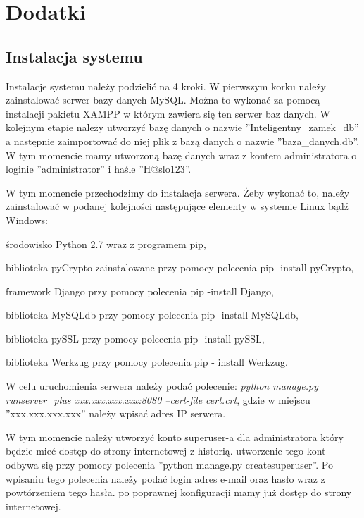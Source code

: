 \newpage
\section*{Dodatki} \label{Dodatki}
\subsection*{Instalacja systemu \NazwaSys}
Instalacje systemu należy podzielić na 4 kroki.
W pierwszym korku należy zainstalować serwer bazy danych MySQL. Można to wykonać za pomocą instalacji pakietu XAMPP w którym zawiera się ten serwer baz danych. W kolejnym etapie należy utworzyć bazę danych o nazwie ''Inteligentny\_zamek\_db'' a następnie zaimportować do niej plik z bazą danych o nazwie ''baza\_danych.db''. W tym momencie mamy utworzoną bazę danych wraz z kontem administratora o loginie ''administrator'' i haśle ''H@slo123''.  

 W tym momencie przechodzimy do instalacja serwera. Żeby wykonać to, należy zainstalować w podanej kolejności następujące elementy w systemie Linux bądź Windows:
\begin{itemize*}
	\item środowisko Python 2.7 wraz z programem pip,
	\item biblioteka pyCrypto zainstalowane przy pomocy polecenia pip -install pyCrypto,
	\item  framework Django przy pomocy polecenia pip -install Django,
	\item biblioteka MySQLdb przy pomocy polecenia pip -install MySQLdb,
	\item  biblioteka pySSL przy pomocy polecenia pip -install pySSL,
	\item biblioteka Werkzug przy pomocy polecenia pip - install Werkzug.
\end{itemize*}



W celu uruchomienia serwera należy podać polecenie:\newline
\textit{python manage.py runserver\_plus xxx.xxx.xxx.xxx:8080 --cert-file cert.crt}, \newline
gdzie w miejscu ''xxx.xxx.xxx.xxx'' należy wpisać adres IP serwera.

W tym momencie należy utworzyć konto superuser-a dla administratora który będzie mieć dostęp do strony internetowej z historią. utworzenie tego kont odbywa się przy pomocy polecenia ''python manage.py createsuperuser''. Po wpisaniu tego polecenia należy podać login adres e-mail oraz hasło wraz z powtórzeniem tego hasła. po poprawnej konfiguracji mamy już dostęp do strony internetowej.

